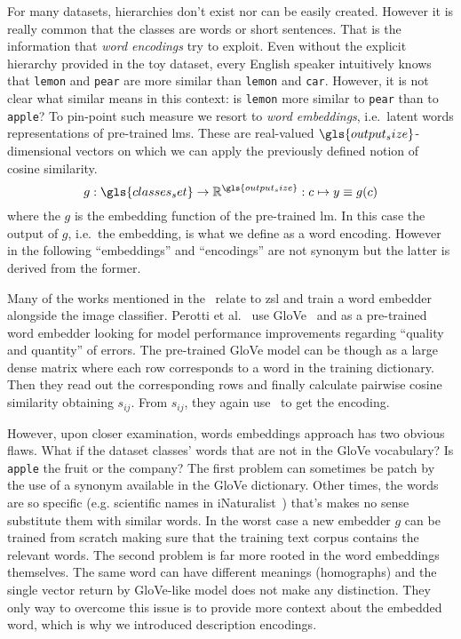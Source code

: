 For many datasets, hierarchies don't exist nor can be easily created. However it is really common that the classes are words or short sentences. That is the information that \emph{word encodings} try to exploit. Even without the explicit hierarchy provided in the toy dataset, every English speaker intuitively knows that \texttt{lemon} and \texttt{pear} are more similar than \texttt{lemon} and \texttt{car}.
However, it is not clear what similar means in this context: is \texttt{lemon} more similar to \texttt{pear} than to \texttt{apple}? To pin-point such measure we resort to \emph{word embeddings}, i.e.\ latent words representations of pre-trained \acrshort{lm}s. These are real-valued $\gls{output_size}$-dimensional vectors on which we can apply the previously defined notion of cosine similarity.
\begin{equation}
  g : \gls{classes_set} \to \mathbb{R}^{\gls{output_size}} :
  c \mapsto y \equiv g(c)
  \label{eq:word-encoding}
\end{equation}
where the $g$ is the embedding function of the pre-trained \acrshort{lm}.
In this case the output of $g$, i.e.\ the embedding, is what we define as a word encoding. However in the following ``embeddings'' and ``encodings'' are not synonym but the latter is derived from the former.

Many of the works mentioned in the~ relate to \acrshort{zsl} and train a word embedder alongside the image classifier.
Perotti et al.~\cite{BeyondOneHotPerott2023} use GloVe~\cite{GloveGlobalVPennin2014} and as a pre-trained word embedder looking for model performance improvements regarding ``quality and quantity'' of errors. The pre-trained GloVe model can be though as a large dense matrix where each row corresponds to a word in the training dictionary. Then they read out the corresponding rows and finally calculate pairwise cosine similarity obtaining $s_{ij}$. From $s_{ij}$, they again use~ to get the encoding.

However, upon closer examination, words embeddings approach has two obvious flaws.
What if the dataset classes' words that are not in the GloVe vocabulary?
Is \texttt{apple} the fruit or the company?
The first problem can sometimes be patch by the use of a synonym available in the GloVe dictionary. Other times, the words are so specific (e.g. scientific names in iNaturalist~\cite{TheInaturalistHorn2017}) that's makes no sense substitute them with similar words. In the worst case a new embedder $g$ can be trained from scratch making sure that the training text corpus contains the relevant words.
The second problem is far more rooted in the word embeddings themselves. The same word can have different meanings (homographs) and the single vector return by GloVe-like model does not make any distinction. They only way to overcome this issue is to provide more context about the embedded word, which is why we introduced description encodings.

